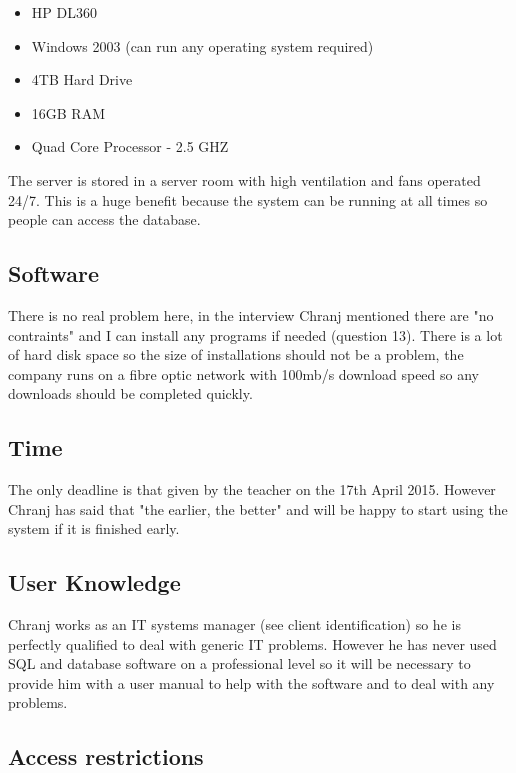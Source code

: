 \begin{itemize}
\item HP DL360
\item Windows 2003 (can run any operating system required)
\item 4TB Hard Drive
\item 16GB RAM
\item Quad Core Processor - 2.5 GHZ
\end{itemize}

The server is stored in a server room with high ventilation and fans operated 24/7. This is a huge benefit because the system can be running at all times so people can access the database.

\subsection{Software}

There is no real problem here, in the interview Chranj mentioned there are "no contraints" and I can install any programs if needed (question 13). There is a lot of hard disk space so the size of installations should not be a problem, the company runs on a fibre optic network with 100mb/s download speed so any downloads should be completed quickly.

\subsection{Time}

The only deadline is that given by the teacher on the 17th April 2015. However Chranj has said that "the earlier, the better" and will be happy to start using the system if it is finished early.

\subsection{User Knowledge}

Chranj works as an IT systems manager (see client identification) so he is perfectly qualified to deal with generic IT problems. However he has never used SQL and database software on a professional level so it will be necessary to provide him with a user manual to help with the software and to deal with any problems.

\subsection{Access restrictions}

